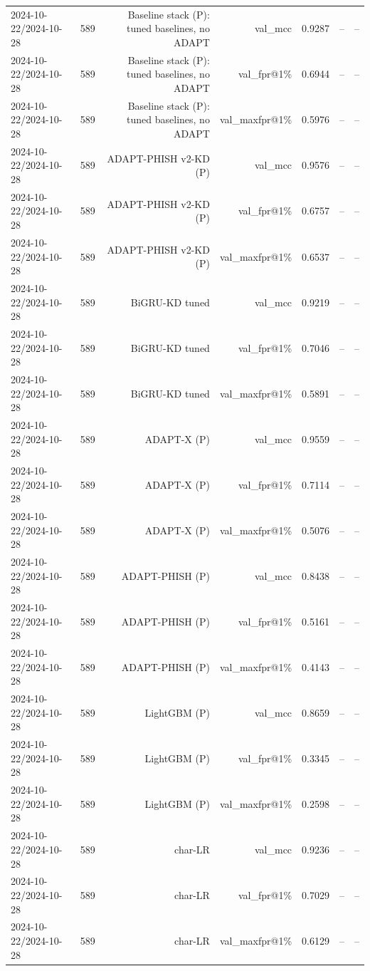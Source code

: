 \begin{table}[t]
\begin{tabular}{llrrrrr}
2024-10-22/2024-10-28 & 589 & Baseline stack (P): tuned baselines, no ADAPT & val\_mcc & 0.9287 & -- & -- \\
2024-10-22/2024-10-28 & 589 & Baseline stack (P): tuned baselines, no ADAPT & val\_fpr@1\% & 0.6944 & -- & -- \\
2024-10-22/2024-10-28 & 589 & Baseline stack (P): tuned baselines, no ADAPT & val\_maxfpr@1\% & 0.5976 & -- & -- \\
2024-10-22/2024-10-28 & 589 & ADAPT-PHISH v2-KD (P) & val\_mcc & 0.9576 & -- & -- \\
2024-10-22/2024-10-28 & 589 & ADAPT-PHISH v2-KD (P) & val\_fpr@1\% & 0.6757 & -- & -- \\
2024-10-22/2024-10-28 & 589 & ADAPT-PHISH v2-KD (P) & val\_maxfpr@1\% & 0.6537 & -- & -- \\
2024-10-22/2024-10-28 & 589 & BiGRU-KD tuned & val\_mcc & 0.9219 & -- & -- \\
2024-10-22/2024-10-28 & 589 & BiGRU-KD tuned & val\_fpr@1\% & 0.7046 & -- & -- \\
2024-10-22/2024-10-28 & 589 & BiGRU-KD tuned & val\_maxfpr@1\% & 0.5891 & -- & -- \\
2024-10-22/2024-10-28 & 589 & ADAPT-X (P) & val\_mcc & 0.9559 & -- & -- \\
2024-10-22/2024-10-28 & 589 & ADAPT-X (P) & val\_fpr@1\% & 0.7114 & -- & -- \\
2024-10-22/2024-10-28 & 589 & ADAPT-X (P) & val\_maxfpr@1\% & 0.5076 & -- & -- \\
2024-10-22/2024-10-28 & 589 & ADAPT-PHISH (P) & val\_mcc & 0.8438 & -- & -- \\
2024-10-22/2024-10-28 & 589 & ADAPT-PHISH (P) & val\_fpr@1\% & 0.5161 & -- & -- \\
2024-10-22/2024-10-28 & 589 & ADAPT-PHISH (P) & val\_maxfpr@1\% & 0.4143 & -- & -- \\
2024-10-22/2024-10-28 & 589 & LightGBM (P) & val\_mcc & 0.8659 & -- & -- \\
2024-10-22/2024-10-28 & 589 & LightGBM (P) & val\_fpr@1\% & 0.3345 & -- & -- \\
2024-10-22/2024-10-28 & 589 & LightGBM (P) & val\_maxfpr@1\% & 0.2598 & -- & -- \\
2024-10-22/2024-10-28 & 589 & char-LR & val\_mcc & 0.9236 & -- & -- \\
2024-10-22/2024-10-28 & 589 & char-LR & val\_fpr@1\% & 0.7029 & -- & -- \\
2024-10-22/2024-10-28 & 589 & char-LR & val\_maxfpr@1\% & 0.6129 & -- & -- \\

\end{tabular}
\end{table}
